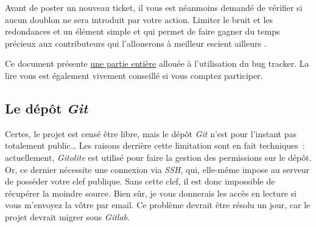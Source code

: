 Avant de poster un nouveau ticket, il vous est néanmoins demandé de vérifier si aucun doublon ne sera introduit par votre action.
 Limiter le bruit et les redondances et un élément simple et qui permet de faire gagner du temps précieux aux contributeurs qui l'allouerons à meilleur escient ailleurs \smiley.

Ce document présente \hyperref[sec:contribution_bt]{une partie entière} allouée à l'utilisation du bug tracker.
La lire vous est également vivement conseillé si vous comptez participer.

\subsection{Le dépôt \emph{Git}}
Certes, le projet est censé être libre, mais le dépôt \emph{Git} n'est pour l'instant pas totalement public\dots{}
Les raisons derrière cette limitation sont en fait techniques~: actuellement, \emph{Gitolite} est utilisé pour faire la gestion des permissions sur le dépôt.
Or, ce dernier nécessite une connexion via \emph{SSH}, qui, elle-même impose au serveur de posséder votre clef publique.
Sans cette clef, il est donc impossible de récupérer la moindre source.
Bien sûr, je vous donnerais les accès en lecture si vous m'envoyez la vôtre par email.
Ce problème devrait être résolu un jour, car le projet devrait migrer sous \emph{Gitlab}.
